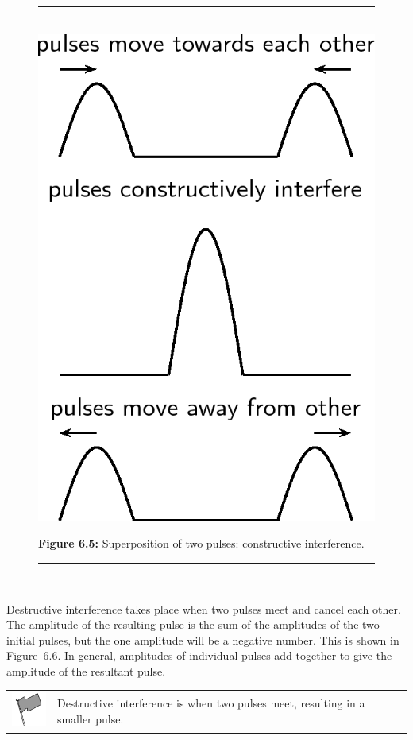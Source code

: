 	\begin{figure}[H] %
    \begin{center}
    \rule[.1in]{\figurerulewidth}{.005in} \\
        \label{m38802*uid53!!!underscore!!!media}\label{m38802*uid53!!!underscore!!!printimage}\includegraphics[width=0.3\columnwidth]{col11305.imgs/m38802_PG10C4_018.png} %
      \vspace{2pt}
    \vspace{\rubberspace}\par \begin{cnxcaption}
	  \small \textbf{Figure 6.5: }Superposition of two pulses: constructive interference.
	\end{cnxcaption}
    \vspace{.1in}
    \rule[.1in]{\figurerulewidth}{.005in} \\
    \end{center}
 \end{figure}       
      \label{m38802*id316190}Destructive interference takes place when two pulses meet and cancel each other. The amplitude of the resulting pulse is the sum of the amplitudes of the two initial pulses, but the one amplitude will be a negative number. This is shown in Figure~6.6. In general, amplitudes of individual pulses add together to give the amplitude of the resultant pulse.\par 
\label{m38802*fhsst!!!underscore!!!id578}\begin{definition}
	  \begin{tabular*}{15 cm}{m{15 mm}m{}}
	\hspace*{-50pt}  \includegraphics[width=0.5in]{col11305.imgs/psflag2.png}   & \Definition{   \label{id2436357}\textbf{ Destructive interference}} { \label{m38802*meaningfhsst!!!underscore!!!id578}
      Destructive interference is when two pulses meet, resulting in a smaller pulse. 
       } 
      \end{tabular*}
      \end{definition}
